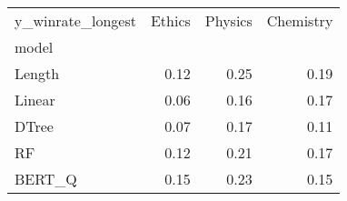 \begin{tabular}{lrrr}
\toprule
y\_winrate\_longest &  Ethics &  Physics &  Chemistry \\
model  &         &          &            \\
\midrule
Length &    0.12 &     0.25 &       0.19 \\
Linear &    0.06 &     0.16 &       0.17 \\
DTree  &    0.07 &     0.17 &       0.11 \\
RF     &    0.12 &     0.21 &       0.17 \\
BERT\_Q &    0.15 &     0.23 &       0.15 \\
\bottomrule
\end{tabular}
